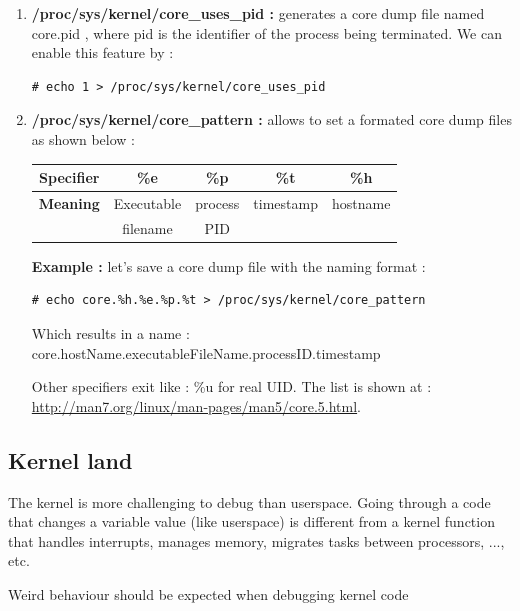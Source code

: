 \begin{enumerate}
		\begin{enumerate}
			\item \textbf{/proc/sys/kernel/core\_uses\_pid : } generates a core dump file named \og core.pid \fg, where pid is the identifier of the process being terminated. We can enable this feature by :
	\begin{lstlisting}[style=BashInputStyle]		
# echo 1 > /proc/sys/kernel/core_uses_pid			
\end{lstlisting}			
			\item \textbf{/proc/sys/kernel/core\_pattern : } allows to set a formated core dump files as shown below :
\begin{center}
	\begin{tabular}{|c|c|c|c|c|}
		\hline
			\textbf{Specifier} & \textbf{\%e} & \textbf{\%p} & \textbf{\%t} & \textbf{\%h}\\	   		
   		\hline
   		\textbf{Meaning} & Executable & process & timestamp & hostname\\
        	             & filename   & PID &  & \\
   		\hline
	\end{tabular}
\end{center}			
			
\textbf{\color{orange}Example :} let's save a core dump file with the naming format :	
	\begin{lstlisting}[style=BashInputStyle]
# echo core.%h.%e.%p.%t > /proc/sys/kernel/core_pattern
\end{lstlisting}	

Which results in a name : \og core.hostName.executableFileName.processID.timestamp \fg

Other specifiers exit like : \%u for real UID. The list is shown at : {\color{blue}\url{http://man7.org/linux/man-pages/man5/core.5.html}}.
		\end{enumerate}
\end{enumerate}

\subsection{Kernel land}
The kernel is more challenging to debug than userspace. Going through a code that changes a variable value (like userspace) is different from a kernel function that handles interrupts, manages memory, migrates tasks between processors, ..., etc.\\
\begin{center}
Weird behaviour should be expected when debugging kernel code
\end{center}  


